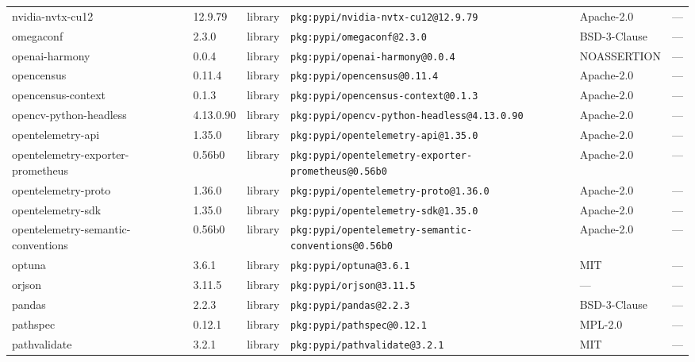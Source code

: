 \documentclass[11pt,a4paper]{article}
\begin{document}
\begin{longtable}{|p{4cm}|p{2cm}|p{1.6cm}|p{5cm}|p{1.5cm}|p{3.5cm}|}
\raggedright nvidia-nvtx-cu12 & 12.9.79 & library & \small\texttt{pkg:pypi/nvidia-nvtx-cu12@12.9.79} & Apache-2.0 & \small — \\
\raggedright omegaconf & 2.3.0 & library & \small\texttt{pkg:pypi/omegaconf@2.3.0} & BSD-3-Clause & \small — \\
\raggedright openai-harmony & 0.0.4 & library & \small\texttt{pkg:pypi/openai-harmony@0.0.4} & NOASSERTION & \small — \\
\raggedright opencensus & 0.11.4 & library & \small\texttt{pkg:pypi/opencensus@0.11.4} & Apache-2.0 & \small — \\
\raggedright opencensus-context & 0.1.3 & library & \small\texttt{pkg:pypi/opencensus-context@0.1.3} & Apache-2.0 & \small — \\
\raggedright opencv-python-headless & 4.13.0.90 & library & \small\texttt{pkg:pypi/opencv-python-headless@4.13.0.90} & Apache-2.0 & \small — \\
\raggedright opentelemetry-api & 1.35.0 & library & \small\texttt{pkg:pypi/opentelemetry-api@1.35.0} & Apache-2.0 & \small — \\
\raggedright opentelemetry-exporter-prometheus & 0.56b0 & library & \small\texttt{pkg:pypi/opentelemetry-exporter-prometheus@0.56b0} & Apache-2.0 & \small — \\
\raggedright opentelemetry-proto & 1.36.0 & library & \small\texttt{pkg:pypi/opentelemetry-proto@1.36.0} & Apache-2.0 & \small — \\
\raggedright opentelemetry-sdk & 1.35.0 & library & \small\texttt{pkg:pypi/opentelemetry-sdk@1.35.0} & Apache-2.0 & \small — \\
\raggedright opentelemetry-semantic-conventions & 0.56b0 & library & \small\texttt{pkg:pypi/opentelemetry-semantic-conventions@0.56b0} & Apache-2.0 & \small — \\
\raggedright optuna & 3.6.1 & library & \small\texttt{pkg:pypi/optuna@3.6.1} & MIT & \small — \\
\raggedright orjson & 3.11.5 & library & \small\texttt{pkg:pypi/orjson@3.11.5} & — & \small — \\
\raggedright pandas & 2.2.3 & library & \small\texttt{pkg:pypi/pandas@2.2.3} & BSD-3-Clause & \small — \\
\raggedright pathspec & 0.12.1 & library & \small\texttt{pkg:pypi/pathspec@0.12.1} & MPL-2.0 & \small — \\
\raggedright pathvalidate & 3.2.1 & library & \small\texttt{pkg:pypi/pathvalidate@3.2.1} & MIT & \small — \\

\end{longtable}
\end{document}
